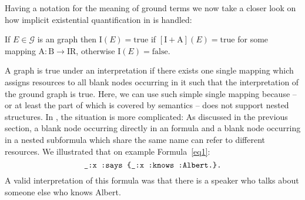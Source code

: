 Having a notation for the meaning of ground terms we now take a closer look on how implicit existential quantification in \rdf is handled:
\begin{definition}\label{rdfbl}
 If $E\in \mathcal{G}$ is an \rdf graph then  $\mathrm{I}(E)=\text{true}$ if $[\mathrm{I}+\mathrm{A}](E)=\text{true}$ for some mapping $\mathrm{A}: \mathrm{B} \rightarrow \mathrm{IR}$, 
 otherwise $\mathrm{I}(E)=\text{false}$.
\end{definition}
A graph is true under an interpretation if there exists one single mapping which assigns resources to all blank nodes occurring in it such that the interpretation of 
the ground graph is true. Here, we can use such simple single mapping because \rdf{} -- or at least the part of \rdf which is covered by \rdf semantics -- does 
not support nested structures.
In \nthree, the situation is more complicated:
As discussed in the previous section, 
a blank node occurring directly in an \nthree formula and a blank node occurring in a nested subformula which share the same name
can refer to different
resources. We illustrated that on example Formula~\ref{eq1}:
\[
\verb!_:x :says {_:x :knows :Albert.}.!
 \]
A valid interpretation of this formula was that there is a speaker who talks about someone else who knows Albert. 

